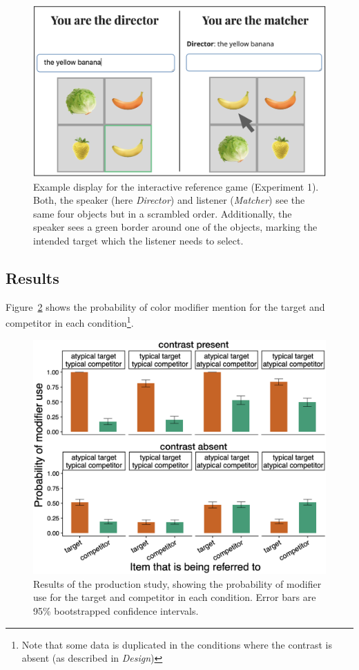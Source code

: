 \documentclass[10pt,letterpaper]{article}
\begin{document}
\begin{figure}
	\begin{center}
		\includegraphics[width=.475\textwidth]{graphs/prod-design.pdf}
	\end{center}
\caption{Example display for the interactive reference game (Experiment 1). Both, the speaker (here \textit{Director}) and listener (\textit{Matcher}) see the same four objects but in a scrambled order. Additionally, the speaker sees a green border around one of the objects, marking the intended target which the listener needs to select.} 
\label{prod-design}
\end{figure}


\subsection{Results}
Figure~\ref{prod-results} shows the probability of color modifier mention for the target and competitor in each condition\footnote{Note that some data is duplicated in the conditions where the contrast is absent (as described in \textit{Design})}. 

\begin{figure}
	\begin{center}
		\includegraphics[width=.475\textwidth]{graphs/prod-bycond-paper.pdf}
	\end{center}
\caption{Results of the production study, showing the probability of modifier use for the target and competitor in each condition. Error bars are 95\% bootstrapped confidence intervals.} 
\label{prod-results}
\end{figure}
\end{document}

